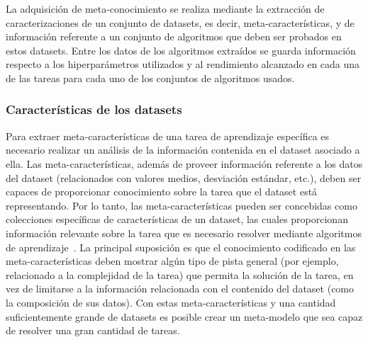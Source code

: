
La adquisición de meta-conocimiento se realiza mediante la extracción de caracterizaciones de un conjunto de datasets, es decir, meta-características, y de información referente a un conjunto de algoritmos que deben ser probados en estos datasets. Entre los datos de los algoritmos extraídos se guarda información respecto a los hiperparámetros utilizados y al rendimiento alcanzado en cada una de las tareas para cada uno de los conjuntos de algoritmos usados.

\subsubsection{Características de los datasets}\label{subsub:metafeat}

Para extraer meta-características de una tarea de aprendizaje específica es necesario realizar un análisis de la información contenida en el dataset asociado a ella. Las meta-características, además de proveer información referente a los datos del dataset (relacionados con valores medios, desviación estándar, etc.), deben ser capaces de proporcionar conocimiento sobre la tarea que el dataset está representando.  Por lo tanto, las meta-características pueden ser concebidas como colecciones específicas de características de un dataset, las cuales proporcionan información relevante sobre la tarea que es necesario resolver mediante algoritmos de aprendizaje~\cite{castiello2005metadata}. La principal suposición es que el conocimiento codificado en las meta-características deben mostrar algún tipo de pista general (por ejemplo, relacionado a la complejidad de la tarea) que permita la solución de la tarea, en vez de limitarse a la información relacionada con el contenido del dataset (como la composición de sus datos). Con estas meta-características y una cantidad suficientemente grande de datasets es posible crear un meta-modelo que sea capaz de resolver una gran cantidad de tareas.

